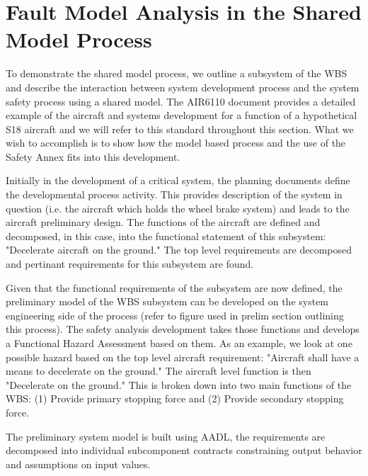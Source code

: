 \section{Fault Model Analysis in the Shared Model Process}
\label{sec:fault_analysis_2}

To demonstrate the shared model process, we outline a subsystem of the WBS and describe the interaction between system development process and the system safety process using a shared model. The AIR6110 document provides a detailed example of the aircraft and systems development for a function of a hypothetical S18 aircraft and we will refer to this standard throughout this section. What we wish to accomplish is to show how the model based process and the use of the Safety Annex fits into this development. 

Initially in the development of a critical system, the planning documents define the developmental process activity. This provides description of the system in question (i.e. the aircraft which holds the wheel brake system) and leads to the aircraft preliminary design. The functions of the aircraft are defined and decomposed, in this case, into the functional statement of this subsystem: "Decelerate aircraft on the ground." The top level requirements are decomposed and pertinant requirements for this subsystem are found. 

Given that the functional requirements of the subsystem are now defined, the preliminary model of the WBS subsystem can be developed on the system engineering side of the process (refer to figure used in prelim section outlining this process). The safety analysis development takes those functions and develops a Functional Hazard Assessment based on them. As an example, we look at one possible hazard based on the top level aircraft requirement: "Aircraft shall have a means to decelerate on the ground." The aircraft level function is then "Decelerate on the ground." This is broken down into two main functions of the WBS: (1) Provide primary stopping force and (2) Provide secondary stopping force. 

The preliminary system model is built using AADL, the requirements are decomposed into individual subcomponent contracts constraining output behavior and assumptions on input values.  

